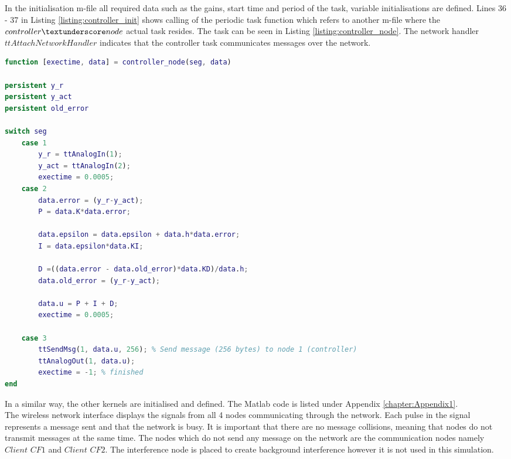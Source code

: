 In the initialisation m-file all required data such as the gains, start time and period of the task, variable initialisations are defined. Lines 36 - 37 in Listing \ref{listing:controller_init} shows calling of the periodic task function which refers to another m-file where the $controller \textunderscore  node$ actual task resides. The task can be seen in Listing \ref{listing:controller_node}. The network handler $ttAttachNetworkHandler$ indicates that the controller task communicates messages over the network.

\begin{lstlisting}[language=Matlab, caption={controller\textunderscore node.m}, label={listing:controller_node}]
function [exectime, data] = controller_node(seg, data)

persistent y_r
persistent y_act
persistent old_error

switch seg
    case 1
        y_r = ttAnalogIn(1);
        y_act = ttAnalogIn(2);
        exectime = 0.0005;
    case 2
        data.error = (y_r-y_act);
        P = data.K*data.error;
        
        data.epsilon = data.epsilon + data.h*data.error;
        I = data.epsilon*data.KI;
        
        D =((data.error - data.old_error)*data.KD)/data.h;
        data.old_error = (y_r-y_act);
        
        data.u = P + I + D;
        exectime = 0.0005;
        
    case 3
        ttSendMsg(1, data.u, 256); % Send message (256 bytes) to node 1 (controller)
        ttAnalogOut(1, data.u);
        exectime = -1; % finished
end
\end{lstlisting}

In a similar way, the other kernels are initialised and defined. The Matlab code is listed under Appendix \ref{chapter:Appendix1}.\\

The wireless network interface displays the signals from all 4 nodes communicating through the network. Each pulse in the signal represents a message sent and that the network is busy. It is important that there are no message collisions, meaning that nodes do not transmit messages at the same time. The nodes which do not send any message on the network are the communication nodes namely $Client$ $CF1$ and $Client$ $CF2$. The interference node is placed to create background interference however it is not used in this simulation.

